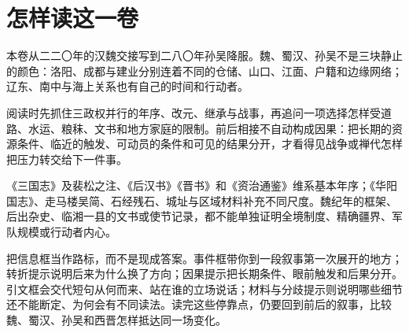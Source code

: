 \chapter*{怎样读这一卷}

本卷从二二〇年的汉魏交接写到二八〇年孙吴降服。魏、蜀汉、孙吴不是三块静止的颜色：洛阳、成都与建业分别连着不同的仓储、山口、江面、户籍和边缘网络；辽东、南中与海上关系也有自己的时间和行动者。

阅读时先抓住三政权并行的年序、改元、继承与战事，再追问一项选择怎样受道路、水运、粮秣、文书和地方家庭的限制。前后相接不自动构成因果：把长期的资源条件、临近的触发、可动员的条件和可见的结果分开，才看得见战争或禅代怎样把压力转交给下一件事。

《三国志》及裴松之注、《后汉书》《晋书》和《资治通鉴》维系基本年序；《华阳国志》、走马楼吴简、石经残石、城址与区域材料补充不同尺度。魏纪年的框架、后出杂史、临湘一县的文书或使节记录，都不能单独证明全境制度、精确疆界、军队规模或行动者内心。

把信息框当作路标，而不是现成答案。事件框带你到一段叙事第一次展开的地方；转折提示说明后来为什么换了方向；因果提示把长期条件、眼前触发和后果分开。引文框会交代短句从何而来、站在谁的立场说话；材料与分歧提示则说明哪些细节还不能断定、为何会有不同读法。读完这些停靠点，仍要回到前后的叙事，比较魏、蜀汉、孙吴和西晋怎样抵达同一场变化。
